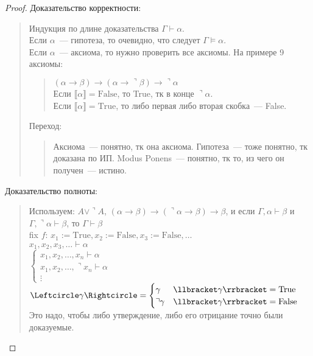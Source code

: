 \documentclass[12pt]{article}
\begin{document}
	\begin{proof}
		Доказательство корректности:
		\begin{quote}
			Индукция по длине доказательства $\Gamma \vdash \alpha$. \\
			Если $\alpha$~--- гипотеза, то очевидно, что следует $\Gamma \vDash \alpha$. \\
			Если $\alpha$~--- аксиома, то нужно проверить все аксиомы. На примере 9 аксиомы:
			\begin{quote}
				$(\alpha \rightarrow \beta) \rightarrow (\alpha \rightarrow \urcorner \beta) \rightarrow \urcorner \alpha$ \\
				Если $\llbracket \alpha \rrbracket = \text{False}$, то True, тк в конце $\urcorner \alpha$. \\
				Если $\llbracket \alpha \rrbracket = \text{True}$, то либо первая либо вторая скобка~--- False.
			\end{quote}
			Переход:
			\begin{quote}
				Аксиома~--- понятно, тк она аксиома. Гипотеза~--- тоже понятно, тк доказана по ИП. Modus Ponens~--- понятно, тк то, из чего он получен~--- истино.
			\end{quote}
		\end{quote}
		Доказательство полноты:
		\begin{quote}
			Используем: $A \vee \urcorner A$, $(\alpha \rightarrow \beta) \rightarrow (\urcorner \alpha \rightarrow \beta) \rightarrow \beta$, и если $\Gamma, \alpha \vdash \beta$ и $\Gamma, \urcorner \alpha \vdash \beta$, то $\Gamma \vdash \beta$ \\
			fix $f$: $x_1 := \text{True}, x_2 := \text{False}, x_3 := \text{False}, \dots$ \\
			$x_1, x_2, x_3, \dots \vdash \alpha$ \\
			$\begin{cases}
				x_1, x_2, \dots, x_n \vdash \alpha \\
				x_1, x_2, \dots, \urcorner x_n \vdash \alpha \\
				\vdots
			\end{cases}$ \\
			$\Leftcircle \gamma \Rightcircle =
			\begin{cases}
				\gamma & \llbracket \gamma \rrbracket = \text{True} \\
				\urcorner \gamma & \llbracket \gamma \rrbracket = \text{False}
			\end{cases}
			$ Это надо, чтобы либо утверждение, либо его отрицание точно были доказуемые. \\
		\end{quote}
	\end{proof}
\end{document}
